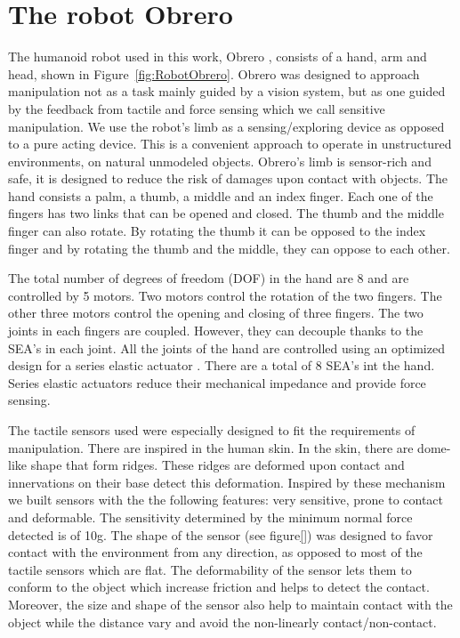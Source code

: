 \section{The robot Obrero}
\label{sec:platform}

The humanoid robot used in this work, Obrero \cite{obrero},
consists of a hand, arm and head, shown in
Figure~\ref{fig:RobotObrero}. Obrero was designed to approach
manipulation not as a task mainly guided by a vision system, but
as one guided by the feedback from tactile and force sensing which
we call sensitive manipulation. We use the robot's limb as a
sensing/exploring device as opposed to a pure acting device. This
is a convenient approach to operate in unstructured environments,
on natural unmodeled objects. Obrero's limb is sensor-rich and
safe, it is designed to reduce the risk of damages upon contact
with objects. The hand consists a palm, a thumb, a middle and an
index finger. Each one of the fingers has two links that can be
opened and closed. The thumb and the middle finger can also
rotate. By rotating the thumb it can be opposed to the index
finger and by rotating the thumb and the middle, they can oppose
to each other.

The total number of degrees of freedom (DOF) in the hand are 8 and
are controlled by 5 motors. Two motors control the rotation of the
two fingers. The other three motors control the opening and
closing of three fingers. The two joints in each fingers are
coupled. However, they can decouple thanks to the SEA's in each
joint. All the joints of the hand are controlled using an
optimized design for a series elastic actuator \cite{actuator}.
There are a total of 8 SEA's int the hand. Series elastic
actuators\cite{williamson95series} reduce their mechanical
impedance and provide force sensing.

The tactile sensors used were especially designed to fit the
requirements of manipulation. There are inspired in the human
skin. In the skin, there are dome-like shape that form ridges.
These ridges are deformed upon contact and innervations on their
base detect this deformation. Inspired by these mechanism we built
sensors with the the following features: very sensitive, prone to
contact and deformable. The sensitivity determined by the minimum
normal force detected is of 10g. The shape of the sensor (see
figure\ref{}) was designed to favor contact with the environment
from any direction, as opposed to most of the tactile sensors
which are flat. The deformability of the sensor lets them to
conform to the object which increase friction and helps to detect
the contact. Moreover, the size and shape of the sensor also help
to maintain contact with the object while the distance vary and
avoid the non-linearly contact/non-contact.

